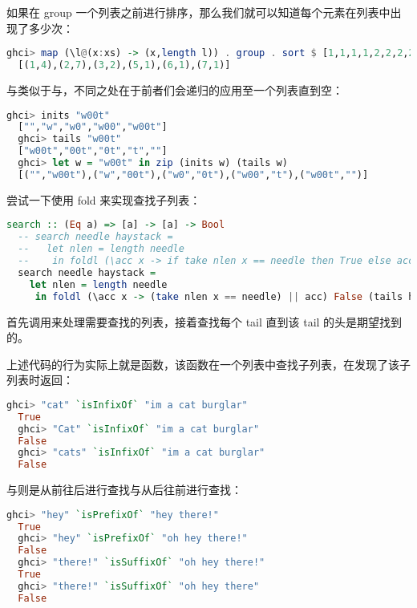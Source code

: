 \documentclass[./main.tex]{subfiles}
\begin{document}
如果在 group 一个列表之前进行排序，那么我们就可以知道每个元素在列表中出现了多少次：

\begin{lstlisting}[language=Haskell]
  ghci> map (\l@(x:xs) -> (x,length l)) . group . sort $ [1,1,1,1,2,2,2,2,3,3,2,2,2,5,6,7]
  [(1,4),(2,7),(3,2),(5,1),(6,1),(7,1)]
\end{lstlisting}

与类似于与，不同之处在于前者们会递归的应用至一个列表直到空：

\begin{lstlisting}[language=Haskell]
  ghci> inits "w00t"
  ["","w","w0","w00","w00t"]
  ghci> tails "w00t"
  ["w00t","00t","0t","t",""]
  ghci> let w = "w00t" in zip (inits w) (tails w)
  [("","w00t"),("w","00t"),("w0","0t"),("w00","t"),("w00t","")]
\end{lstlisting}

尝试一下使用 fold 来实现查找子列表：

\begin{lstlisting}[language=Haskell]
  search :: (Eq a) => [a] -> [a] -> Bool
  -- search needle haystack =
  --   let nlen = length needle
  --    in foldl (\acc x -> if take nlen x == needle then True else acc) False (tails haystack)
  search needle haystack =
    let nlen = length needle
     in foldl (\acc x -> (take nlen x == needle) || acc) False (tails haystack)
\end{lstlisting}

首先调用来处理需要查找的列表，接着查找每个 tail 直到该 tail 的头是期望找到的。

上述代码的行为实际上就是函数，该函数在一个列表中查找子列表，在发现了该子列表时返回：

\begin{lstlisting}[language=Haskell]
  ghci> "cat" `isInfixOf` "im a cat burglar"
  True
  ghci> "Cat" `isInfixOf` "im a cat burglar"
  False
  ghci> "cats" `isInfixOf` "im a cat burglar"
  False
\end{lstlisting}

与则是从前往后进行查找与从后往前进行查找：

\begin{lstlisting}[language=Haskell]
  ghci> "hey" `isPrefixOf` "hey there!"
  True
  ghci> "hey" `isPrefixOf` "oh hey there!"
  False
  ghci> "there!" `isSuffixOf` "oh hey there!"
  True
  ghci> "there!" `isSuffixOf` "oh hey there"
  False
\end{lstlisting}
\end{document}
